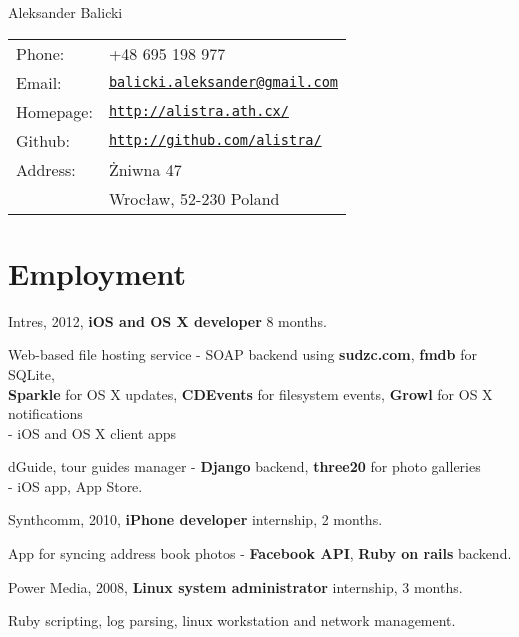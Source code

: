 \documentclass[letterpaper]{article}
\def\name{Aleksander Balicki}
\renewenvironment{itemize}{
  \begin{list}{}{
    \setlength{\leftmargin}{1.5em}
  }
}{
  \end{list}
}
\begin{document}
{\huge \name}


\vspace{0.25in}

\begin{minipage}{0.45\linewidth}
  \begin{tabular}{ll}
    Phone: 	& +48 695 198 977 \\
    Email: 	& \href{mailto:balicki.aleksander@gmail.com}{\tt balicki.aleksander@gmail.com} \\
    Homepage: 	& \href{http://alistra.ath.cx/}{\tt http://alistra.ath.cx/} \\
    Github:     & \href{http://github.com/alistra/}{\tt http://github.com/alistra/}\\
    Address: 	& Żniwna 47\\
    		& Wrocław, 52-230 Poland
  \end{tabular}
\end{minipage}

\section*{Employment}

\begin{itemize}


	\item Intres, 2012, {\bf iOS and OS X developer} 8 months.
		\begin{itemize}
		    \item Web-based file hosting service - SOAP backend using {\bf sudzc.com}, {\bf fmdb} for SQLite,\\
			{\bf Sparkle} for OS X updates, {\bf CDEvents} for filesystem events, {\bf Growl} for OS X notifications \\
				- iOS and OS X client apps
			\item dGuide, tour guides manager - {\bf Django} backend, {\bf three20} for photo galleries \\
				- iOS app, App Store.
		\end{itemize}
	\item Synthcomm, 2010, {\bf iPhone developer} internship, 2 months.
		\begin{itemize}
			\item App for syncing address book photos - {\bf Facebook API}, {\bf Ruby on rails} backend.
		\end{itemize}
	\item Power Media, 2008, {\bf Linux system administrator} internship, 3 months.
		\begin{itemize}
			\item Ruby scripting, log parsing, linux workstation and network management.
		\end{itemize}
\end{itemize}
\end{document}
